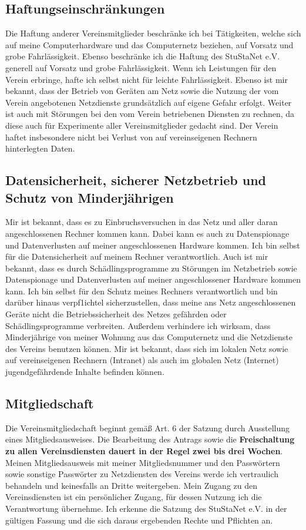 \documentclass[a4paper,12pt]{scrartcl}
\begin{document}
\subsection*{Haftungseinschränkungen}
Die Haftung anderer Vereinsmitglieder beschränke ich bei Tätigkeiten, welche sich auf meine Computerhardware und das Computernetz beziehen, auf Vorsatz und grobe Fahrlässigkeit. Ebenso beschränke ich die Haftung des StuStaNet e.V. generell auf Vorsatz und grobe Fahrlässigkeit. Wenn ich Leistungen für den Verein erbringe, hafte ich selbst nicht für leichte Fahrlässigkeit. Ebenso ist mir bekannt, dass der Betrieb von Geräten am Netz sowie die Nutzung der vom Verein angebotenen Netzdienste grundsätzlich auf eigene Gefahr erfolgt. Weiter ist auch mit Störungen bei den vom Verein betriebenen Diensten zu rechnen, da diese auch für Experimente aller Vereinsmitglieder gedacht sind. Der Verein haftet insbesondere nicht bei Verlust von auf vereinseigenen Rechnern hinterlegten Daten.

\subsection*{Datensicherheit, sicherer Netzbetrieb und Schutz von Minderjährigen}
Mir ist bekannt, dass es zu Einbruchsversuchen in das Netz und aller daran angeschlossenen Rechner kommen kann. Dabei kann es auch zu Datenspionage und Datenverlusten auf meiner angeschlossenen Hardware kommen. Ich bin selbst für die Datensicherheit auf meinem Rechner verantwortlich. Auch ist mir bekannt, dass es durch Schädlingsprogramme zu Störungen im Netzbetrieb sowie Datenspionage und Datenverlusten auf meiner angeschlossener Hardware kommen kann. Ich bin selbst für den Schutz meines Rechners verantwortlich und bin darüber hinaus verpf1ichtel sicherzustellen, dass meine ans Netz angeschlossenen Geräte nicht die Betriebssicherheit des Netzes gefährden oder Schädlingsprogramme verbreiten. Außerdem verhindere ich wirksam, dass Minderjährige von meiner Wohnung aus das Computernetz und die Netzdienste des Vereins benutzen können. Mir ist bekannt, dass sich im lokalen Netz sowie auf vereinseigenen Rechnern (Intranet) als auch im globalen Netz (Internet) jugendgefährdende Inhalte befinden können.

\subsection*{Mitgliedschaft}
Die Vereinsmitgliedschaft beginnt gemäß Art. 6 der Satzung durch Ausstellung eines Mitgliedsausweises. Die Bearbeitung des Antrags sowie die \textbf{Freischaltung zu allen Vereinsdiensten dauert in der Regel zwei bis drei Wochen}. Meinen Mitgliedsausweis mit meiner Mitgliedsnummer und den Passwörtern sowie sonstige Passwörter zu Netzdiensten des Vereins werde ich vertraulich behandeln und keinesfalls an Dritte weitergeben. Mein Zugang zu den Vereinsdiensten ist ein persönlicher Zugang, für dessen Nutzung ich die Verantwortung übernehme. Ich erkenne die Satzung des StuStaNet e.V. in der gültigen Fassung und die sich daraus ergebenden Rechte und Pflichten an.
\end{document}
